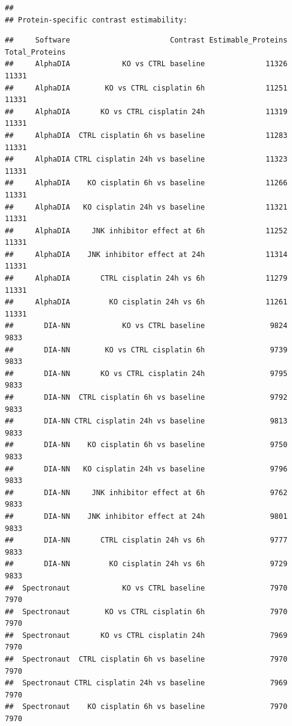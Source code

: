 \documentclass[
  10pt,
]{article}
\begin{document}
\begin{verbatim}
## 
## Protein-specific contrast estimability:
\end{verbatim}

\begin{verbatim}
##     Software                       Contrast Estimable_Proteins Total_Proteins
##     AlphaDIA            KO vs CTRL baseline              11326          11331
##     AlphaDIA        KO vs CTRL cisplatin 6h              11251          11331
##     AlphaDIA       KO vs CTRL cisplatin 24h              11319          11331
##     AlphaDIA  CTRL cisplatin 6h vs baseline              11283          11331
##     AlphaDIA CTRL cisplatin 24h vs baseline              11323          11331
##     AlphaDIA    KO cisplatin 6h vs baseline              11266          11331
##     AlphaDIA   KO cisplatin 24h vs baseline              11321          11331
##     AlphaDIA     JNK inhibitor effect at 6h              11252          11331
##     AlphaDIA    JNK inhibitor effect at 24h              11314          11331
##     AlphaDIA       CTRL cisplatin 24h vs 6h              11279          11331
##     AlphaDIA         KO cisplatin 24h vs 6h              11261          11331
##       DIA-NN            KO vs CTRL baseline               9824           9833
##       DIA-NN        KO vs CTRL cisplatin 6h               9739           9833
##       DIA-NN       KO vs CTRL cisplatin 24h               9795           9833
##       DIA-NN  CTRL cisplatin 6h vs baseline               9792           9833
##       DIA-NN CTRL cisplatin 24h vs baseline               9813           9833
##       DIA-NN    KO cisplatin 6h vs baseline               9750           9833
##       DIA-NN   KO cisplatin 24h vs baseline               9796           9833
##       DIA-NN     JNK inhibitor effect at 6h               9762           9833
##       DIA-NN    JNK inhibitor effect at 24h               9801           9833
##       DIA-NN       CTRL cisplatin 24h vs 6h               9777           9833
##       DIA-NN         KO cisplatin 24h vs 6h               9729           9833
##  Spectronaut            KO vs CTRL baseline               7970           7970
##  Spectronaut        KO vs CTRL cisplatin 6h               7970           7970
##  Spectronaut       KO vs CTRL cisplatin 24h               7969           7970
##  Spectronaut  CTRL cisplatin 6h vs baseline               7970           7970
##  Spectronaut CTRL cisplatin 24h vs baseline               7969           7970
##  Spectronaut    KO cisplatin 6h vs baseline               7970           7970

\end{verbatim}
\end{document}
